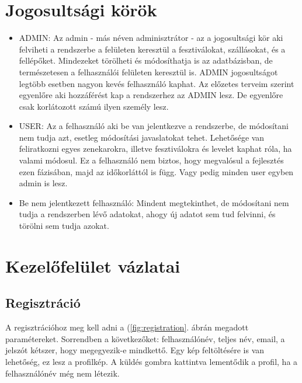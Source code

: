 \section{Jogosultsági körök}

\begin{itemize}
\item ADMIN: Az admin - más néven adminisztrátor - az a jogosultsági kör aki felviheti a rendszerbe a felületen keresztül a fesztiválokat, szállásokat, és a fellépőket. Mindezeket törölheti és módosíthatja is az adatbázisban, de természetesen a felhasználói felületen keresztül is. ADMIN jogosultságot legtöbb esetben nagyon kevés felhasználó kaphat. Az előzetes terveim szerint egyenlőre aki hozzáférést kap a rendszerhez az ADMIN lesz. De egyenlőre csak korlátozott számú ilyen személy lesz.
\item USER: Az a felhasználó aki be van jelentkezve a rendszerbe, de módosítani nem tudja azt, esetleg módosítási javaslatokat tehet. Lehetősége van feliratkozni egyes zenekarokra, illetve fesztiválokra és levelet kaphat róla, ha valami módosul. Ez a felhasználó nem biztos, hogy megvalósul a fejlesztés ezen fázisában, majd az időkorláttól is függ. Vagy pedig minden user egyben admin is lesz.
\item Be nem jelentkezett felhasználó: Mindent megtekinthet, de módosítani nem tudja a rendszerben lévő adatokat, ahogy új adatot sem tud felvinni, és törölni sem tudja azokat.
\end{itemize}

\section{Kezelőfelület vázlatai}

\subsection{Regisztráció}
A regisztrációhoz meg kell adni a (\ref{fig:registration}. ábrán megadott paramétereket. Sorrendben a következőket: felhasználónév, teljes név, email, a jelszót kétszer, hogy megegyezik-e mindkettő. Egy kép feltöltésére is van lehetőség, ez lesz a profilkép. A küldés gombra kattintva lementődik a profil, ha a felhasználónév még nem létezik.

